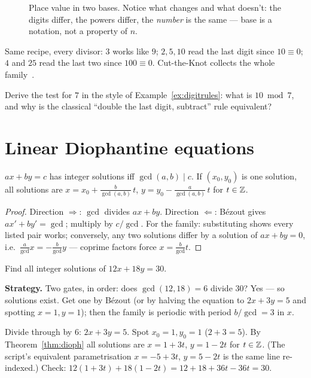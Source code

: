 \begin{figure}[ht]\centering

\caption{Place value in two bases. Notice what changes and what doesn't:
the digits differ, the powers differ, the \emph{number} is the same --- base
is a notation, not a property of $n$.}
\label{fig:base}
\end{figure}

Same recipe, every divisor: $3$ works like $9$; $2, 5, 10$ read the last
digit since $10 \equiv 0$; $4$ and $25$ read the last two since
$100 \equiv 0$. Cut-the-Knot collects the whole family~\cite{cuttheknot}.

\begin{exercise}[easy]\label{exr:digit}
Derive the test for $7$ in the style of Example~\ref{ex:digitrules}: what
is $10 \bmod 7$, and why is the classical ``double the last digit, subtract''
rule equivalent?
\end{exercise}

\section{Linear Diophantine equations}\label{sec:dioph}

\begin{theorem}\label{thm:dioph}
$ax + by = c$ has integer solutions iff $\gcd(a,b) \mid c$. If $(x_0, y_0)$
is one solution, all solutions are
$x = x_0 + \frac{b}{\gcd(a,b)}\,t$,\; $y = y_0 - \frac{a}{\gcd(a,b)}\,t$
for $t \in \mathbb{Z}$.
\end{theorem}

\begin{proof}
Direction $\Rightarrow$: $\gcd$ divides $ax + by$. Direction $\Leftarrow$:
B\'ezout gives $ax' + by' = \gcd$; multiply by $c/\gcd$. For the family:
substituting shows every listed pair works; conversely, any two solutions
differ by a solution of $ax + by = 0$, i.e.\ $\frac{a}{\gcd}x =
-\frac{b}{\gcd}y$ --- coprime factors force
$x = \frac{b}{\gcd}t$.
\end{proof}

\begin{example}\label{ex:dioph}
Find all integer solutions of $12x + 18y = 30$.
\par\smallskip
\textbf{Strategy.} Two gates, in order: does $\gcd(12,18) = 6$ divide $30$?
Yes --- so solutions exist. Get one by B\'ezout (or by halving the equation
to $2x + 3y = 5$ and spotting $x = 1, y = 1$); then the family is periodic
with period $b/\gcd = 3$ in $x$.
\par\smallskip
\begin{solution}
Divide through by $6$: $2x + 3y = 5$. Spot $x_0 = 1, y_0 = 1$
($2 + 3 = 5$). By Theorem~\ref{thm:dioph} all solutions are
$x = 1 + 3t$, $y = 1 - 2t$ for $t \in \mathbb{Z}$. (The script's equivalent
parametrisation $x = -5 + 3t$, $y = 5 - 2t$ is the same line re-indexed.)
Check: $12(1 + 3t) + 18(1 - 2t) = 12 + 18 + 36t - 36t = 30$.
\end{solution}
\end{example}

